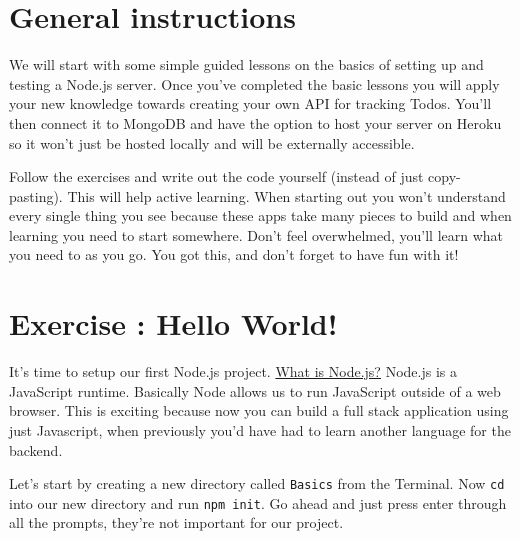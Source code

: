 \documentclass{42-en}
\begin{document}
\chapter{General instructions}

    We will start with some simple guided lessons on the basics of setting up 
and testing a Node.js server. Once you've completed the basic lessons you will 
apply your new knowledge towards creating your own API for tracking Todos. You’ll then connect it to MongoDB and have the option to host your server on Heroku so it won’t just be hosted locally and will be externally accessible.

Follow the exercises and write out the code yourself (instead of just copy-pasting). This will help active learning. When starting out you won’t understand every single thing you see because these apps take many pieces to build and when learning you need to start somewhere. Don’t feel overwhelmed, you’ll learn what you need to as you go. You got this, and don’t forget to have fun with it!

\startexercices


\chapter{Exercise \exercicenumber: Hello World!}

    It’s time to setup our first Node.js project. \href{https://codeburst.io/the-only-nodejs-introduction-youll-ever-need-d969a47ef219}{What is Node.js?} Node.js is a JavaScript runtime. Basically Node allows us to run JavaScript outside of a web browser. This is exciting because now you can build a full stack application using just Javascript, when previously you’d have had to learn another language for the backend.

	Let's start by creating a new directory called \texttt{Basics} from the Terminal. Now \texttt{cd} into our new directory and run \texttt{npm init}. Go ahead and just press enter through all the prompts, they're not important for our project.
\end{document}
